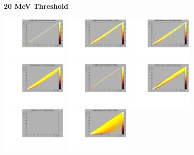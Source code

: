 \textbf{20 MeV Threshold}

\begin{center}

  \includegraphics[width=0.245\textwidth]{plots/response_matrix/Proton_KE_FHC_CCOther_20MeV.pdf}
  \includegraphics[width=0.245\textwidth]{plots/response_matrix/PiPlus_KE_FHC_CCOther_20MeV.pdf}
  \includegraphics[width=0.245\textwidth]{plots/response_matrix/PiMinus_KE_FHC_CCOther_20MeV.pdf}
  \includegraphics[width=0.245\textwidth]{plots/response_matrix/Charged_Pi_KE_FHC_CCOther_20MeV.pdf}
  \includegraphics[width=0.245\textwidth]{plots/response_matrix/Pi0_KE_FHC_CCOther_20MeV.pdf}
  \includegraphics[width=0.245\textwidth]{plots/response_matrix/Proton+Pion_KE_FHC_CCOther_20MeV.pdf}
  \includegraphics[width=0.245\textwidth]{plots/response_matrix/Total_FHC_CCOther_20MeV.pdf}
  \includegraphics[width=0.245\textwidth]{plots/response_matrix/Hadrons_FHC_CCOther_20MeV.pdf}

\end{center}

